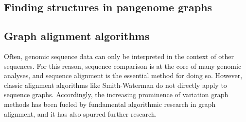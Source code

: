 


\subsection{Finding structures in pangenome graphs}

\subsection{Graph alignment algorithms}
Often, genomic sequence data can only be interpreted in the context of other sequences. 
For this reason, sequence comparison is at the core of many genomic analyses, and sequence alignment is the essential method for doing so. 
However, classic alignment algorithms like Smith-Waterman\cite{Smith_1981} do not directly apply to sequence graphs. 
Accordingly, the increasing prominence of variation graph methods has been fueled by fundamental algorithmic research in graph alignment, and it has also spurred further research.

